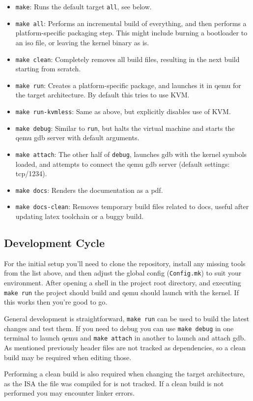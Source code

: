 \begin{itemize}
    \item \verb|make|: Runs the default target \verb|all|, see below.
    \item \verb|make all|: Performs an incremental build of everything, and then performs a platform-specific packaging step. This might include burning a bootloader to an iso file, or leaving the kernel binary as is.
    \item \verb|make clean|: Completely removes all build files, resulting in the next build starting from scratch.
    \item \verb|make run|: Creates a platform-specific package, and launches it in qemu for the target architecture. By default this tries to use KVM.
    \item \verb|make run-kvmless|: Same as above, but explicitly disables use of KVM.
    \item \verb|make debug|: Similar to \verb|run|, but halts the virtual machine and starts the qemu gdb server with default arguments.
    \item \verb|make attach|: The other half of \verb|debug|, launches gdb with the kernel symbols loaded, and attempts to connect the qemu gdb server (default settings: tcp/1234).
    \item \verb|make docs|: Renders the documentation as a pdf.
    \item \verb|make docs-clean|: Removes temporary build files related to docs, useful after updating latex toolchain or a buggy build.
\end{itemize}

\subsection{Development Cycle}
For the initial setup you'll need to clone the repository, install any missing tools from the list above, and then adjust the global config (\verb|Config.mk|) to suit your environment. After opening a shell in the project root directory, and executing \verb|make run| the project should build and qemu should launch with the kernel. If this works then you're good to go.

General development is straightforward, \verb|make run| can be used to build the latest changes and test them. If you need to debug you can use \verb|make debug| in one terminal to launch qemu and \verb|make attach| in another to launch and attach gdb. As mentioned previously header files are not tracked as dependencies, so a clean build may be required when editing those.

Performing a clean build is also required when changing the target architecture, as the ISA the file was compiled for is not tracked. If a clean build is not performed you may encounter linker errors.
